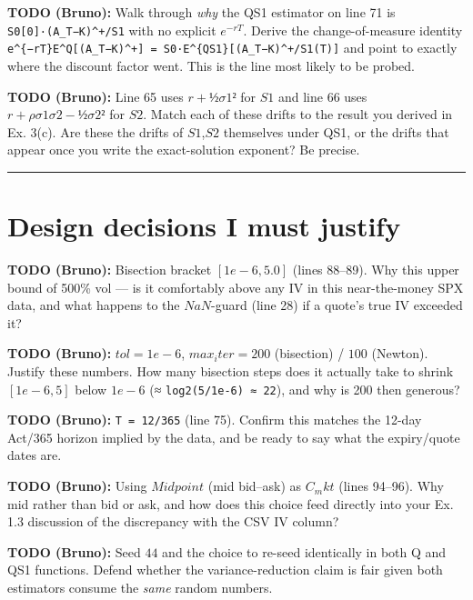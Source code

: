 \documentclass[
  11pt,
]{article}
\begin{document}
\textbf{TODO (Bruno):} Walk through \emph{why} the QS1 estimator on line
71 is \texttt{S0{[}0{]}·(A\_T−K)\^{}+/S1} with no explicit \(e^{−rT}\).
Derive the change-of-measure identity
\texttt{e\^{}\{−rT\}E\^{}Q{[}(A\_T−K)\^{}+{]}\ =\ S0·E\^{}\{QS1\}{[}(A\_T−K)\^{}+/S1(T){]}}
and point to exactly where the discount factor went. This is the line
most likely to be probed.

\textbf{TODO (Bruno):} Line 65 uses \(r + ½σ1²\) for \(S1\) and line 66
uses \(r + ρσ1σ2 − ½σ2²\) for \(S2\). Match each of these drifts to the
result you derived in Ex. 3(c). Are these the drifts of \(S1\),\(S2\)
themselves under QS1, or the drifts that appear once you write the
exact-solution exponent? Be precise.

\begin{center}\rule{0.5\linewidth}{0.5pt}\end{center}

\hypertarget{design-decisions-i-must-justify}{%
\section{Design decisions I must
justify}\label{design-decisions-i-must-justify}}

\textbf{TODO (Bruno):} Bisection bracket \([1e-6, 5.0]\) (lines 88--89).
Why this upper bound of 500\% vol --- is it comfortably above any IV in
this near-the-money SPX data, and what happens to the \(NaN\)-guard
(line 28) if a quote's true IV exceeded it?

\textbf{TODO (Bruno):} \(tol = 1e-6\), \(max_iter = 200\) (bisection) /
\(100\) (Newton). Justify these numbers. How many bisection steps does
it actually take to shrink \([1e-6,5]\) below \(1e-6\) (≈
\texttt{log2(5/1e-6)\ ≈\ 22}), and why is 200 then generous?

\textbf{TODO (Bruno):} \texttt{T\ =\ 12/365} (line 75). Confirm this
matches the 12-day Act/365 horizon implied by the data, and be ready to
say what the expiry/quote dates are.

\textbf{TODO (Bruno):} Using \(Midpoint\) (mid bid--ask) as \(C_mkt\)
(lines 94--96). Why mid rather than bid or ask, and how does this choice
feed directly into your Ex. 1.3 discussion of the discrepancy with the
CSV IV column?

\textbf{TODO (Bruno):} Seed \(44\) and the choice to re-seed identically
in both Q and QS1 functions. Defend whether the variance-reduction claim
is fair given both estimators consume the \emph{same} random numbers.
\end{document}
